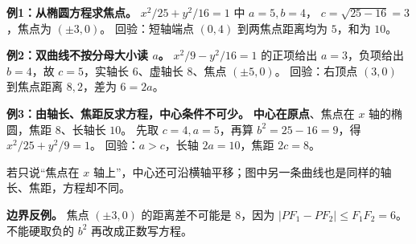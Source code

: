 \begin{examplebox}
\textbf{例1：从椭圆方程求焦点。} $x^2/25+y^2/16=1$ 中 $a=5,b=4$，
$c=\sqrt{25-16}=3$，焦点为 $\boxed{(\pm3,0)}$。
回验：短轴端点 $(0,4)$ 到两焦点距离均为 $5$，和为 $10$。

\medskip
\textbf{例2：双曲线不按分母大小读 $a$。}
$x^2/9-y^2/16=1$ 的正项给出 $a=3$，负项给出 $b=4$，故
$c=5$，实轴长 $6$、虚轴长 $8$、焦点 $\boxed{(\pm5,0)}$。
回验：右顶点 $(3,0)$ 到焦点距离 $8,2$，差为 $6=2a$。

\medskip
\textbf{例3：由轴长、焦距反求方程，中心条件不可少。}
\textbf{中心在原点}、焦点在 $x$ 轴的椭圆，焦距 $8$、长轴长 $10$。
先取 $c=4,a=5$，再算 $b^2=25-16=9$，得 $\boxed{x^2/25+y^2/9=1}$。
回验：$a>c$，长轴 $2a=10$，焦距 $2c=8$。

若只说“焦点在 $x$ 轴上”，中心还可沿横轴平移；图中另一条曲线也是同样的轴长、焦距，方程却不同。

\medskip
\textbf{边界反例。} 焦点 $(\pm3,0)$ 的距离差不可能是 $8$，因为
$|PF_1-PF_2|\le F_1F_2=6$。不能硬取负的 $b^2$ 再改成正数写方程。
\end{examplebox}
\clearpage
